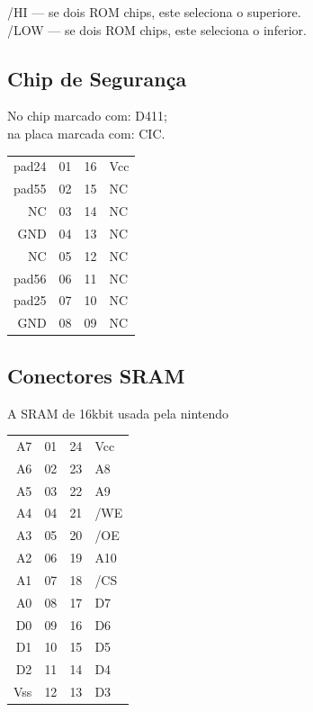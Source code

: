 \documentclass[paper=a4, fontsize=11pt]{scrartcl}	%
\numberwithin{equation}{section}															%
\numberwithin{figure}{section}																%
\numberwithin{table}{section}																%
\begin{document}
 
/HI --- se dois ROM chips, este seleciona o superiore.\\
/LOW --- se dois ROM chips, este seleciona o inferior. 

\subsection*{Chip de Segurança}

No chip marcado com: D411;\\
na placa marcada com: CIC.\\

\begin{tabular}{rlrl}
            pad24 & 01   &   16 & Vcc\\
            pad55 & 02   &   15 & NC\\
               NC & 03   &   14 & NC\\
              GND & 04   &   13 & NC\\
               NC & 05   &   12 & NC\\
            pad56 & 06   &   11 & NC\\
            pad25 & 07   &   10 & NC\\
              GND & 08   &   09 & NC\\
\end{tabular}


\subsection*{Conectores SRAM}

A SRAM de 16kbit usada pela nintendo\\
\begin{tabular}{rlrl}
                A7 &  01   &      24  & Vcc\\
                A6 &  02   &      23  & A8\\
                A5 &  03   &      22  & A9\\
                A4 &  04   &      21  & /WE\\
                A3 &  05   &      20  & /OE\\
                A2 &  06   &      19  & A10\\
                A1 &  07   &      18  & /CS\\
                A0 &  08   &      17  & D7\\
                D0 &  09   &      16  & D6\\
                D1 &  10   &      15  & D5\\
                D2 &  11   &      14  & D4\\
               Vss &  12   &      13  & D3\\
\end{tabular}
\end{document}
